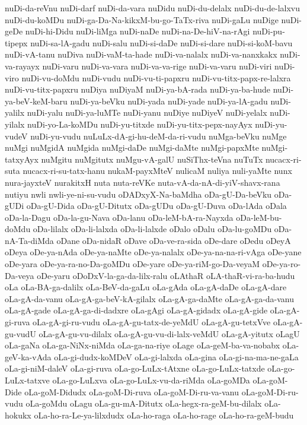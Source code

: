 {nuDi-da-reVnu
nuDi-darf
nuDi-da-vara
nuDidu
nuDi-du-delalx
nuDi-du-de-lalxvu
nuDi-du-koMDu
nuDi-ga-Da-Na-kikxM-bu-go-TaTx-riva
nuDi-gaLu
nuDige
nuDi-geDe
nuDi-hi-Didu
nuDi-liMga
nuDi-naDe
nuDi-na-De-hiV-na-rAgi
nuDi-pu-tipepx
nuDi-sa-lA-gadu
nuDi-salu
nuDi-si-daDe
nuDi-si-dare
nuDi-si-koM-bavu
nuDi-vA-tanu
nuDiva
nuDi-vaM-ta-hade
nuDi-va-nalalx
nuDi-va-nanxkakx
nuDi-va-rayayx
nuDi-varu
nuDi-va-vara
nuDi-va-va-rige
nuDi-va-varu
nuDi-viri
nuDi-viro
nuDi-vu-doMdu
nuDi-vudu
nuDi-vu-ti-papxru
nuDi-vu-titx-papx-re-lalxra
nuDi-vu-titx-papxru
nuDiya
nuDiyaM
nuDi-ya-bA-rada
nuDi-ya-ba-hude
nuDi-ya-beV-keM-baru
nuDi-ya-beVku
nuDi-yada
nuDi-yade
nuDi-ya-lA-gadu
nuDi-yalilx
nuDi-yalu
nuDi-ya-luMTe
nuDi-yanu
nuDiye
nuDiyeV
nuDi-yelalx
nuDi-yilalx
nuDi-yo-La-koMDu
nuDi-yu-titxde
nuDi-yu-titx-pepx-nayAyx
nuDi-yu-vudeV
nuDi-yu-vudu
nuLuLx-dA-gi-hu-deM-da-ri-vudu
nuMga-beVku
nuMge
nuMgi
nuMgidA
nuMgida
nuMgi-daDe
nuMgi-daMte
nuMgi-papxMte
nuMgi-tatxyAyx
nuMgitu
nuMgitutx
nuMgu-vA-galU
nuSiThx-teVna
nuTuTx
nucacx-ri-suta
nucacx-ri-su-tatx-hanu
nukaM-payxMteV
nulicaM
nuliya
nuli-yaMte
nunx
nura-jayxteV
nurakitxH
nuta
nuta-reVKe
nuta-vA-da-nA-di-yiV-shavx-rana
nutiyu
nwli
nwli-ye-ni-su-vudu
oDADxyX-Na-baMdha
oDa-gU-Da-beVku
oDa-gUDi
oDa-gU-Dida
oDa-gU-Ditutx
oDa-gUDu
oDa-gU-Duva
oDa-lAda
oDala
oDa-la-Dagu
oDa-la-gu-Nava
oDa-lanu
oDa-leM-bA-ra-Nayxda
oDa-leM-bu-doMdu
oDa-lilalx
oDa-li-lalxda
oDa-li-lalxde
oDalo
oDalu
oDa-lu-goMDu
oDa-nA-Ta-diMda
oDane
oDa-nidaR
oDave
oDa-ve-ra-sida
oDe-dare
oDedu
oDeyA
oDeya
oDe-ya-nAda
oDe-ya-naMte
oDe-ya-nalalx
oDe-ya-na-na-ri-vAga
oDe-yane
oDe-yara
oDe-ya-ra-no-Da-goMDu
oDe-yare
oDe-ya-riM-go-Da-veyaM
oDe-ya-ro-Da-veya
oDe-yaru
oDoDxV-la-ga-da-lilx-ralu
oLAthaR
oLA-thaR-vi-ra-ba-hudu
oLa
oLa-BA-ga-dalilx
oLa-BeV-da-gaLu
oLa-gAda
oLa-gA-daDe
oLa-gA-dare
oLa-gA-da-vanu
oLa-gA-ga-beV-kA-gilalx
oLa-gA-ga-daMte
oLa-gA-ga-da-vanu
oLa-gA-gade
oLa-gA-ga-di-dadxre
oLa-gAgi
oLa-gA-gidadx
oLa-gA-gide
oLa-gA-gi-ruva
oLa-gA-gi-ru-vudu
oLa-gA-gu-tatx-de-yeMdU
oLa-gA-gu-tetxVve
oLa-gA-gu-vudU
oLa-gA-gu-vu-dilalx
oLa-gA-gu-vu-di-lalx-veMdU
oLa-gA-yitutx
oLagU
oLa-gaNa
oLa-ga-NiNx-niMda
oLa-ga-na-riye
oLage
oLa-geM-ba-va-nobabx
oLa-geV-ka-vAda
oLa-gi-dudx-koMDeV
oLa-gi-lalxda
oLa-gina
oLa-gi-na-ma-ne-gaLa
oLa-gi-niM-daleV
oLa-gi-ruva
oLa-go-LuLx-tAtxne
oLa-go-LuLx-tatxde
oLa-go-LuLx-tatxve
oLa-go-LuLxva
oLa-go-LuLx-vu-da-riMda
oLa-goMDa
oLa-goM-Dide
oLa-goM-Didudx
oLa-goM-Di-ruva
oLa-goM-Di-ru-va-vanu
oLa-goM-Di-ru-vudu
oLa-goMdu
oLagu
oLa-gu-mA-Ditutx
oLa-hegx-ra-geM-bu-dilalx
oLa-hokukx
oLa-ho-ra-Le-ya-lilxdudx
oLa-ho-raga
oLa-ho-rage
oLa-ho-ra-geM-budu
}
